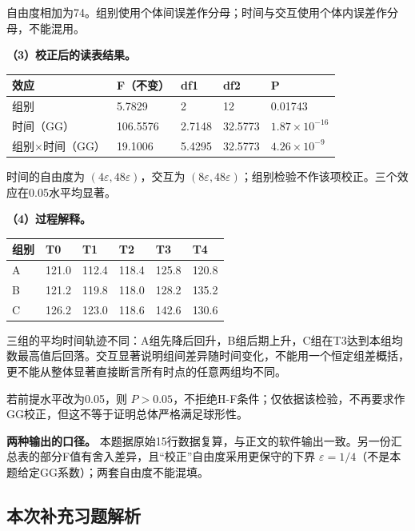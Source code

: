 自由度相加为74。组别使用个体间误差作分母；时间与交互使用个体内误差作分母，不能混用。

\textbf{（3）校正后的读表结果。}

\begin{center}\small\setlength{\tabcolsep}{5pt}\renewcommand{\arraystretch}{1.18}\begin{tabular}{@{}lllll@{}}
\toprule
效应 & F（不变） & df1 & df2 & P \\
\midrule

组别 & 5.7829 & 2 & 12 & 0.01743 \\
时间（GG） & 106.5576 & 2.7148 & 32.5773 & \(1.87\times10^{-16}\) \\
组别×时间（GG） & 19.1006 & 5.4295 & 32.5773 & \(4.26\times10^{-9}\) \\
\bottomrule\end{tabular}\end{center}

时间的自由度为 \((4\varepsilon,48\varepsilon)\)，交互为 \((8\varepsilon,48\varepsilon)\)；组别检验不作该项校正。三个效应在0.05水平均显著。

\textbf{（4）过程解释。}

\begin{center}\small\setlength{\tabcolsep}{5pt}\renewcommand{\arraystretch}{1.18}\begin{tabular}{@{}llllll@{}}
\toprule
组别 & T0 & T1 & T2 & T3 & T4 \\
\midrule

A & 121.0 & 112.4 & 118.4 & 125.8 & 120.8 \\
B & 121.2 & 119.8 & 118.0 & 128.2 & 135.2 \\
C & 126.2 & 123.0 & 118.6 & 142.6 & 130.6 \\
\bottomrule\end{tabular}\end{center}

三组的平均时间轨迹不同：A组先降后回升，B组后期上升，C组在T3达到本组均数最高值后回落。交互显著说明组间差异随时间变化，不能用一个恒定组差概括，更不能从整体显著直接断言所有时点的任意两组均不同。

若前提水平改为0.05，则 \(P>0.05\)，不拒绝H-F条件；仅依据该检验，不再要求作GG校正，但这不等于证明总体严格满足球形性。

\textbf{两种输出的口径。} 本题据原始15行数据复算，与正文的软件输出一致。另一份汇总表的部分F值有舍入差异，且``校正''自由度采用更保守的下界 \(\varepsilon=1/4\)（不是本题给定GG系数）；两套自由度不能混填。
\subsection*{本次补充习题解析}

\EndExercises

